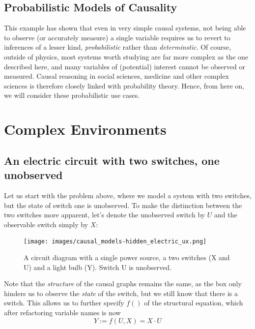 \documentclass[
]{book}
\theoremstyle{definition}
\theoremstyle{definition}
\theoremstyle{definition}
\theoremstyle{remark}
\begin{document}
\hypertarget{probabilistic-models-of-causality}{%
\subsection{Probabilistic Models of Causality}\label{probabilistic-models-of-causality}}

This example has shown that even in very simple causal systems, not being able to observe (or accurately measure) a single variable requires us to revert to inferences of a lesser kind, \emph{probabilistic} rather than \emph{determinstic}. Of course, outside of physics, most systems worth studying are far more complex as the one described here, and many variables of (potential) interest cannot be observed or measured. Causal reasoning in social sciences, medicine and other complex sciences is therefore closely linked with probability theory. Hence, from here on, we will consider these probabilistic use cases.

\hypertarget{complex-environments}{%
\section{Complex Environments}\label{complex-environments}}

\hypertarget{an-electric-circuit-with-two-switches-one-unobserved}{%
\subsection{An electric circuit with two switches, one unobserved}\label{an-electric-circuit-with-two-switches-one-unobserved}}

Let us start with the problem above, where we model a system with two switches, but the state of switch one is unobserved. To make the distinction between the two switches more apparent, let's denote the unobserved switch by \(U\) and the observable switch simply by \(X\):

\begin{figure}
\centering
\texttt{[image: images/causal\_models-hidden\_electric\_ux.png]}
\caption{A circuit diagram with a single power source, a two switches (X and U) and a light bulb (Y). Switch U is unobserved.}
\end{figure}

Note that the \emph{structure} of the causal graphs remains the same, as the box only hinders us to observe the \emph{state} of the switch, but we still know that there is a switch. This allows us to further specify \(f()\) of the structural equation, which after refactoring variable names is now
\begin{equation}
Y := f(U, X) = X \cdot U
\end{equation}
\end{document}
